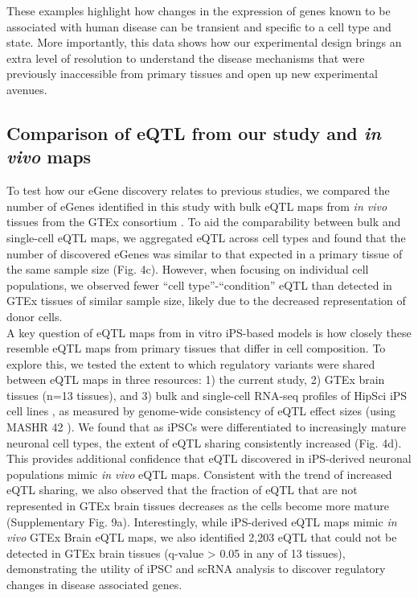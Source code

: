 These examples highlight how changes in the expression of genes known to be associated with human disease can be transient and specific to a cell type and state. More importantly, this data shows how our experimental design brings an extra level of resolution to understand the disease mechanisms that were previously inaccessible from primary tissues and open up new experimental avenues.

\subsection{Comparison of eQTL from our study and \textit{in vivo} maps}


To test how our eGene discovery relates to previous studies, we compared the number of eGenes identified in this study with bulk eQTL maps from \textit{in vivo} tissues from the GTEx consortium \cite{gtex2017genetic}. 
To aid the comparability between bulk and single-cell eQTL maps,
we aggregated eQTL across cell types and found that the number of discovered eGenes
was similar to that expected in a primary tissue of the same sample size (Fig. 4c). However, when focusing on individual cell populations, we observed fewer “cell type”-“condition” eQTL than detected in GTEx tissues of similar sample size, likely due to the decreased representation of donor cells.\\

A key question of eQTL maps from in vitro iPS-based models is how closely these resemble eQTL maps from primary tissues that differ in cell composition. 
To explore this, we tested the extent to which regulatory variants were shared between eQTL maps in three resources: 1) the current study, 2) GTEx brain tissues (n=13 tissues), and 3) bulk and single-cell RNA-seq profiles of HipSci iPS cell lines \cite{bonder2019systematic, cuomo2020single}, as measured by genome-wide consistency of eQTL effect sizes (using MASHR 42 \cite{urbut2019flexible}). 
We found that as iPSCs were differentiated to increasingly mature neuronal cell types, the extent of eQTL sharing consistently increased (Fig. 4d). 
This provides additional confidence that eQTL discovered in iPS-derived neuronal
populations mimic \textit{in vivo} eQTL maps. 
Consistent with the trend of increased eQTL sharing, we also observed that the fraction of eQTL that are not represented in GTEx brain tissues decreases as the cells become more mature (Supplementary Fig. 9a). 
Interestingly, while iPS-derived eQTL maps mimic \textit{in vivo} GTEx Brain eQTL maps, we also identified 2,203 eQTL that could not be detected in GTEx brain tissues (q-value > 0.05 in any of 13 tissues), demonstrating the utility of iPSC and scRNA analysis to discover regulatory changes in disease associated genes.\\

